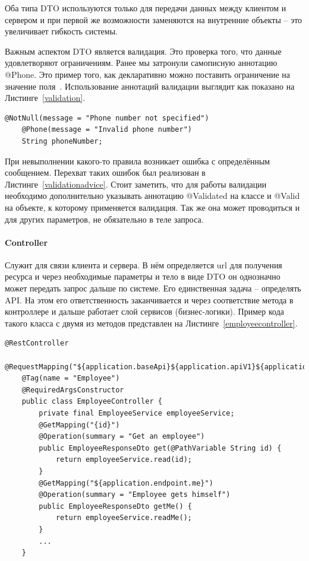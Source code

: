 \documentclass[a4paper,article]{article}
\begin{document}
\begin{sloppypar}
    Оба типа DTO используются только для передачи данных между клиентом и сервером и при первой же возможности заменяются на внутренние объекты -- это увеличивает гибкость системы.

    Важным аспектом DTO является валидация. Это проверка того, что данные удовлетворяют ограничениям. Ранее мы затронули самописную аннотацию @Phone. Это пример того, как декларативно можно поставить ограничение на значение поля~\cite{baeldungbook}. Использование аннотаций валидации выглядит как показано на Листинге~\ref{validation}.

    \begin{lstlisting}[label=validation,caption=Пример валидации]
    @NotNull(message = "Phone number not specified")
    @Phone(message = "Invalid phone number")
    String phoneNumber;
    \end{lstlisting}

    При невыполнении какого-то правила возникает ошибка с определённым сообщением. Перехват таких ошибок был реализован в Листинге~\ref{validationadvice}. Стоит заметить, что для работы валидации необходимо дополнительно указывать аннотацию @Validated на классе и @Valid на объекте, к которому применяется валидация. Так же она может проводиться и для других параметров, не обязательно в теле запроса.

    \paragraph{Controller}\label{Реализация. Сервер. Controller}

    Служит для связи клиента и сервера. В нём определяется url для получения ресурса и через необходимые параметры и тело в виде DTO он однозначно может передать запрос дальше по системе. Его единственная задача -- определять API. На этом его ответственность заканчивается и через соответствие метода в контроллере и дальше работает слой сервисов (бизнес-логики). Пример кода такого класса с двумя из методов представлен на Листинге~\ref{employeecontroller}.

    \begin{lstlisting}[label=employeecontroller,caption=Пример класса слоя представления]
    @RestController
    @RequestMapping("${application.baseApi}${application.apiV1}${application.endpoint.employees}")
    @Tag(name = "Employee")
    @RequiredArgsConstructor
    public class EmployeeController {
        private final EmployeeService employeeService;
        @GetMapping("{id}")
        @Operation(summary = "Get an employee")
        public EmployeeResponseDto get(@PathVariable String id) {
            return employeeService.read(id);
        }
        @GetMapping("${application.endpoint.me}")
        @Operation(summary = "Employee gets himself")
        public EmployeeResponseDto getMe() {
            return employeeService.readMe();
        }
        ...
    }
    \end{lstlisting}


\end{sloppypar}
\end{document}
